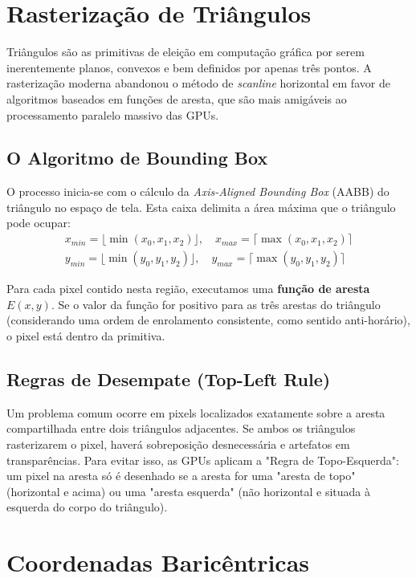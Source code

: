 \section{Rasterização de Triângulos}

Triângulos são as primitivas de eleição em computação gráfica por serem inerentemente planos, convexos e bem definidos por apenas três pontos. A rasterização moderna abandonou o método de \textit{scanline} horizontal em favor de algoritmos baseados em funções de aresta, que são mais amigáveis ao processamento paralelo massivo das GPUs.

\subsection{O Algoritmo de Bounding Box}

O processo inicia-se com o cálculo da \textit{Axis-Aligned Bounding Box} (AABB) do triângulo no espaço de tela. Esta caixa delimita a área máxima que o triângulo pode ocupar:
\begin{align}
    x_{min} = \lfloor \min(x_0, x_1, x_2) \rfloor, \quad x_{max} = \lceil \max(x_0, x_1, x_2) \rceil \\
    y_{min} = \lfloor \min(y_0, y_1, y_2) \rfloor, \quad y_{max} = \lceil \max(y_0, y_1, y_2) \rceil
\end{align}

Para cada pixel contido nesta região, executamos uma \textbf{função de aresta} $E(x, y)$. Se o valor da função for positivo para as três arestas do triângulo (considerando uma ordem de enrolamento consistente, como sentido anti-horário), o pixel está dentro da primitiva.

\subsection{Regras de Desempate (Top-Left Rule)}

Um problema comum ocorre em pixels localizados exatamente sobre a aresta compartilhada entre dois triângulos adjacentes. Se ambos os triângulos rasterizarem o pixel, haverá sobreposição desnecessária e artefatos em transparências. Para evitar isso, as GPUs aplicam a "Regra de Topo-Esquerda": um pixel na aresta só é desenhado se a aresta for uma "aresta de topo" (horizontal e acima) ou uma "aresta esquerda" (não horizontal e situada à esquerda do corpo do triângulo).

\section{Coordenadas Baricêntricas}

